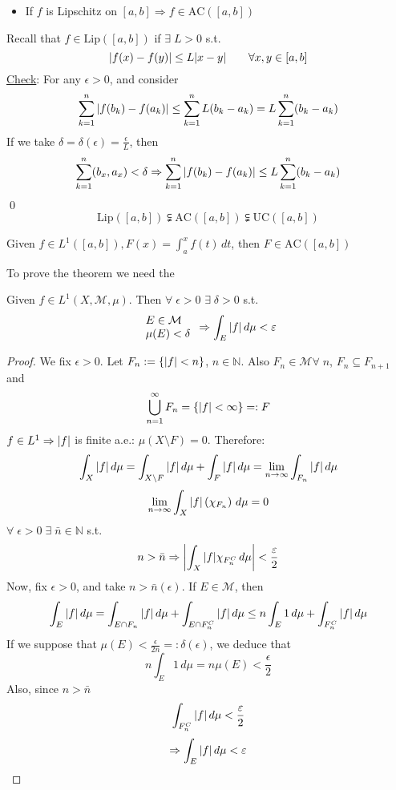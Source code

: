 \begin{itemize}
    \item If \(f\) is Lipschitz on \([a,b] \Rightarrow f \in \text{AC}([a,b])\) 
\end{itemize}
Recall that \(f \in \mbox{Lip}([a,b])\) if \(\exists \; L > 0\) s.t. 
\[
    \abs{f(x) - f(y)} \leq L\abs{x-y} \qquad \forall x, y \in \left[a, b\right]
\]
\underline{Check}: For any \(\epsilon > 0\), and consider 
\[
    \sum_{k=1}^n \abs{f(b_k)-f(a_k)} \leq \sum_{k=1}^n L(b_k-a_k) = L \sum_{k=1}^n (b_k-a_k)
\]
If we take \(\delta = \delta(\epsilon) = \frac{\epsilon}{L}\), then 
\[
    \sum_{k=1}^n (b_x, a_x) < \delta \Rightarrow \sum_{k=1}^n \abs{f(b_k)-f(a_k) } \leq L \sum_{k=1}^n (b_k-a_k)
\]
\qed
\[
    \mbox{Lip}([a,b]) \subsetneqq \mbox{AC}([a,b]) \subsetneqq \mbox{UC}([a,b])
\]
\begin{theorem}
    Given \(f \in L^1([a,b]), F(x) = \int_a^xf(t) \, dt\), then \(F \in \mbox{AC}([a,b])\)
\end{theorem}
To prove the theorem we need the
\begin{theorem}
    Given \(f \in L^1(X, \mathcal{M}, \mu)\). Then \(\forall \; \epsilon >0 \) \(\exists \; \delta > 0\) s.t.     
    \[
        \begin{array}{l}
            E \in \mathcal{M} \\
            \mu(E) < \delta
        \end{array} 
        \Rightarrow \int_E \abs{f} \, d\mu < \varepsilon
    \]
\end{theorem}
\begin{proof}
    We fix \(\epsilon > 0\). Let \(F_n := \left\{ \abs{f} < n \right\}\), \(n \in \mathbb{N}\). Also \(F_n \in \mathcal{M} \forall \; n\), \(F_n \subseteq F_{n+1}\) and 
    \[
        \bigcup_{n=1}^{\infty} F_n = \left\{ \abs{f} < \infty \right\} =: F
    \]
    \(f \in L^1 \Rightarrow \abs{f}\) is finite a.e.: \(\mu(X \setminus F) =0\).
    Therefore:
    \[
        \int_X \abs{f} \, d\mu = \int_{X \setminus F} \abs{f} \, d\mu + \int_F \abs{f} \, d\mu 
        = \lim_{n \to\infty} \int_{F_n} \abs{f} \, d\mu
    \]
    \[
        \lim_{n\to\infty} \int_X \abs{f} \left(\- \chi_{F_n} \right) \, d\mu =0
    \]
    \(\forall \; \epsilon >0 \; \exists \; \bar{n} \in \mathbb{N}\) s.t. 
    \[
        n > \bar{n} \Rightarrow \abs{\int_X \abs{f} \chi_{F_n^C} \, d\mu} < \frac{\varepsilon}{2}
    \]
    Now, fix \(\epsilon >0 \), and take \(n > \bar{n}(\epsilon)\). If \(E \in \mathcal{M}\), then
    \[
        \int_E \abs{f} \, d\mu = \int_{E \cap F_n} \abs{f} \, d\mu + \int_{E \cap F_n^C} \abs{f} \, d\mu
        \leq n \int_E 1 \, d\mu + \int_{F_n^C} \abs{f} \, d\mu 
    \]
    If we suppose that \(\mu(E) < \frac{\epsilon}{2n} =: \delta(\epsilon)\), we deduce that
    \[
        n \int_E 1 \, d\mu = n \mu(E) < \frac{\epsilon}{2}
    \]
    Also, since \(n > \bar{n}\)
    \[
        \int_{F_n^C} \abs{f} \, d\mu < \frac{\varepsilon}{2}
    \]
    \[
        \Rightarrow \int_E \abs{f} \, d\mu < \varepsilon \]
\end{proof}
